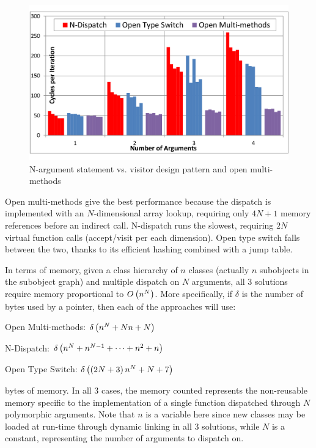 \begin{figure}[htbp]
  \centering
    \includegraphics[width=\linewidth]{Timing-N-arg.pdf}
  \caption{N-argument  statement vs. visitor design pattern and open multi-methods}
  \label{fig:dispatch}
\end{figure}

Open multi-methods give the best performance because the dispatch is 
implemented with an $N$-dimensional array lookup, requiring only $4N+1$ memory 
references before an indirect call. N-dispatch runs the slowest, 
requiring $2N$ virtual function calls (accept/visit per each dimension). Open 
type switch falls between the two, thanks to its efficient hashing combined 
with a jump table.

In terms of memory, given a class hierarchy of $n$ classes (actually $n$ subobjects in 
the subobject graph) and multiple dispatch on $N$ arguments,
all 3 solutions require memory proportional to $O\left(n^N\right)$. 
More specifically, if $\delta$ is the number of bytes used by a pointer, then 
each of the approaches will use:

\begin{compactitem}
\setlength{\itemsep}{0pt}
\setlength{\parskip}{0pt}
\item Open Multi-methods: $\delta\left(n^N+Nn+N\right)$
\item N-Dispatch: $\delta\left(n^N+n^{N-1}+\cdots+n^2+n\right)$
\item Open Type Switch: $\delta\left(\left(2N+3\right)n^N+N+7\right)$
\end{compactitem}

\noindent
bytes of memory. In all 3 cases, the memory counted represents the non-reusable 
memory specific to the implementation of a single function dispatched through 
$N$ polymorphic arguments. Note that $n$ is a variable here since new classes 
may be loaded at run-time through dynamic linking in all 3 solutions, while $N$ 
is a constant, representing the number of arguments to dispatch on.

